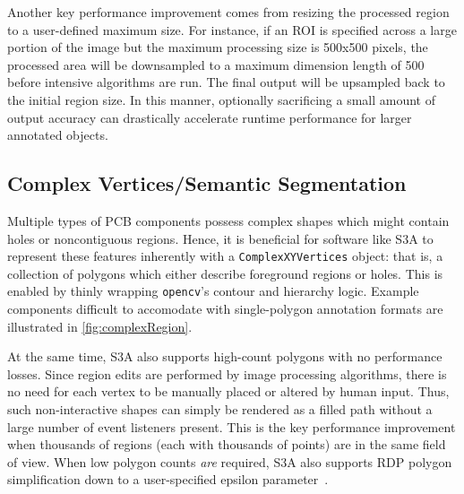 Another key performance improvement comes from resizing the processed region to a user-defined maximum size.
For instance, if an ROI is specified across a large portion of the image but the maximum processing size is 500x500 pixels, the processed area will be downsampled to a maximum dimension length of 500 before intensive algorithms are run.
The final output will be upsampled back to the initial region size.
In this manner, optionally sacrificing a small amount of output accuracy can drastically accelerate runtime performance for larger annotated objects.

\makeRegionEditFig

\subsection{Complex Vertices/Semantic Segmentation}
Multiple types of PCB components possess complex shapes which might contain holes or noncontiguous regions.
Hence, it is beneficial for software like S3A to represent these features inherently with a \texttt{ComplexXYVertices} object: that is, a collection of polygons which either describe foreground regions or holes.
This is enabled by thinly wrapping \texttt{opencv}'s contour and hierarchy logic.
Example components difficult to accomodate with single-polygon annotation formats are illustrated in \autoref{fig:complexRegion}.

\makeComplexRegionFig

At the same time, S3A also supports high-count polygons with no performance losses.
Since region edits are performed by image processing algorithms, there is no need for each vertex to be manually placed or altered by human input.
Thus, such non-interactive shapes can simply be rendered as a filled path without a large number of event listeners present.
This is the key performance improvement when thousands of regions (each with thousands of points) are in the same field of view.
When low polygon counts \emph{are} required, S3A also supports RDP polygon simplification down to a user-specified epsilon parameter~\cite{ramer_iterative_1972}.

